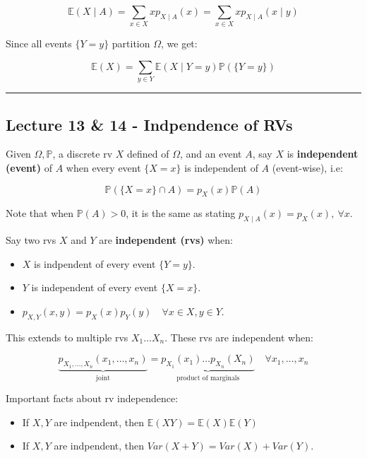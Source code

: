 \documentclass{article}
\begin{document}
\[
  \mathbb{E}(X\mid A) = \sum_{x\in X} xp_{X\mid A}(x) = \sum_{x\in X}
  xp_{X\mid A}(x \mid y)
\]

Since all events $\{Y = y\}$ partition $\Omega$, we get:

\[
  \mathbb{E}(X) = \sum_{y\in Y} \mathbb{E}(X \mid Y=y)
  \mathbb{P}(\{Y=y\})
\]


\medskip\hrule
\subsection{Lecture 13 \& 14 - Indpendence of RVs}

Given $\Omega, \mathbb{P}$, a discrete rv $X$ defined of $\Omega$, and
an event $A$, say $X$ is \textbf{independent (event)} of $A$ when
every event $\{X=x\}$ is independent of $A$ (event-wise), i.e:

\begin{equation}
  \tag{RV Event Independence}
  \boxed{
    \mathbb{P}(\{X=x\} \cap A) = p_X(x) \mathbb{P}(A)
  }
\end{equation}

Note that when $\mathbb{P}(A) > 0$, it is the same as stating
$p_{X\mid A} (x) = p_X(x),\ \forall x$.

Say two rvs $X$ and $Y$ are \textbf{independent (rvs)} when:

\begin{itemize}
\item $X$ is indpendent of every event $\{Y=y\}$.
\item $Y$ is independent of every event $\{X=x\}$.
\item $p_{X,Y}(x,y) = p_X(x) p_Y(y) \quad \forall x\in X, y\in Y$.
\end{itemize}

This extends to multiple rvs $X_1\dots X_n$. These rvs are independent
when:

\[
  \underbrace{p_{X_1,\dots,X_n}(x_1,\dots,x_n)}_{\text{joint}} =
  \underbrace{p_{X_1}(x_1)\dots p_{X_n}(X_n)}_{\text{product of
      marginals}} \quad \forall x_1, \dots, x_n
\]

Important facts about rv independence:

\begin{itemize}
\item If $X, Y$ are indpendent, then $\mathbb{E}(XY) = \mathbb{E}(X)
  \mathbb{E}(Y)$
  
\item If $X, Y$ are indpendent, then $Var(X+Y) = Var(X) + Var(Y)$.  
\end{itemize}
\end{document}
